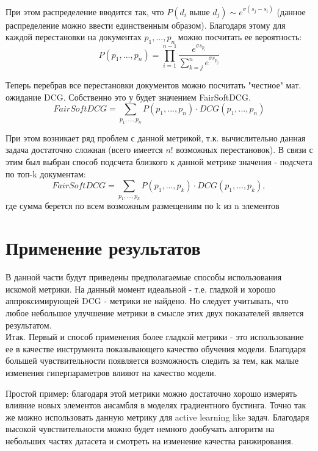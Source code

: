 \documentclass[14pt,a4paper]{amsart}
\theoremstyle{definition}
\theoremstyle{definition}
\newcommand{\Sum}{\sum\limits}
\renewcommand\t{\text}
\begin{document}
При этом распределение вводится так, что $P(d_i \t{ выше } d_j) \sim e^{\sigma(s_j - s_i)}$ (данное распределение можно ввести единственным образом). Благодаря этому для каждой перестановки на документах $p_1,...,p_n$ можно посчитать ее вероятность:
$$P(p_1,...,p_n) = \prod\limits_{i=1}^{n - 1} \frac{e^{\sigma s_{p_i}}}{\Sum_{k=j}^n e^{\sigma s_{p_j}}}$$

Теперь перебрав все перестановки документов можно посчитать "честное" мат. ожидание DCG. Собственно это у будет значением FairSoftDCG.
$$FairSoftDCG = \Sum_{p_1,...,p_n} P(p_1,...,p_n) \cdot DCG(p_1,...,p_n)$$

При этом возникает ряд проблем с данной метрикой, т.к. вычислительно данная задача достаточно сложная (всего имеется $n!$ возможных перестановок). В связи с этим был выбран способ подсчета близкого к данной метрике значения - подсчета по топ-k документам:
$$FairSoftDCG = \Sum_{p_1,...,p_k} P(p_1,...,p_k) \cdot DCG(p_1,...,p_k),$$ где сумма берется по всем возможным размещениям по k из n элементов



\newpage
\section{Применение результатов}

В данной части будут приведены предполагаемые способы использования искомой метрики. На данный момент идеальной - т.е. гладкой и хорошо аппроксимирующей DCG - метрики не найдено. Но следует учитывать, что любое небольшое улучшение метрики в смысле этих двух показателей является результатом. \\

Итак. Первый и способ применения более гладкой метрики - это использование ее в качестве инструмента показывающего качество обучения модели. Благодаря большей чувствительности появляется возможность следить за тем, как малые изменения гиперпараметров влияют на качество модели.

Простой пример: благодаря этой метрики можно достаточно хорошо измерять влияние новых элементов ансамбля в моделях градиентного бустинга. Точно так же можно использовать данную метрику для active learning like задач. Благодаря высокой чувствительности можно будет немного дообучать алгоритм на небольших частях датасета и смотреть на изменение качества ранжирования. \\
\end{document}

